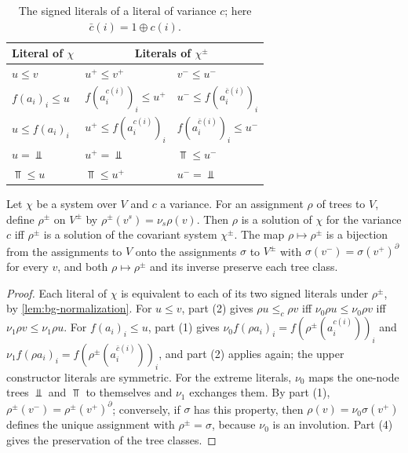 \begin{table}[t]
\caption{The signed literals of a literal of variance $c$; here
$\bar c(i)=1\oplus c(i)$.}
\label{tab:bg-signed}
\centering
\begin{tabular}{@{}lll@{}}
\toprule
Literal of $\chi$ & \multicolumn{2}{c}{Literals of $\chi^\pm$}\\
\midrule
$u\le v$ & $u^+\le v^+$ & $v^-\le u^-$\\
$f(a_i)_i\le u$ & $f(a_i^{c(i)})_i\le u^+$ & $u^-\le f(a_i^{\bar c(i)})_i$\\
$u\le f(a_i)_i$ & $u^+\le f(a_i^{c(i)})_i$ & $f(a_i^{\bar c(i)})_i\le u^-$\\
$u=\Bot$ & $u^+=\Bot$ & $\Top\le u^-$\\
$\Top\le u$ & $\Top\le u^+$ & $u^-=\Bot$\\
\bottomrule
\end{tabular}
\end{table}

\begin{lemma}\label{lem:bg-signed}
Let $\chi$ be a system over $V$ and $c$ a variance. For an assignment $\rho$ of
trees to $V$, define $\rho^\pm$ on $V^\pm$ by $\rho^\pm(v^s)=\nu_s\rho(v)$. Then
$\rho$ is a solution of $\chi$ for the variance $c$ iff $\rho^\pm$ is a solution
of the covariant system $\chi^\pm$. The map $\rho\mapsto\rho^\pm$ is a bijection
from the assignments to $V$ onto the assignments $\sigma$ to $V^\pm$ with
$\sigma(v^-)=\sigma(v^+)^{\partial}$ for every $v$, and both $\rho\mapsto\rho^\pm$
and its inverse preserve each tree class.
\end{lemma}
\begin{proof}
Each literal of $\chi$ is equivalent to each of its two signed literals under
$\rho^\pm$, by \cref{lem:bg-normalization}. For $u\le v$, part (2) gives
$\rho u\le_c\rho v$ iff $\nu_0\rho u\le\nu_0\rho v$ iff
$\nu_1\rho v\le\nu_1\rho u$. For $f(a_i)_i\le u$, part (1) gives
$\nu_0f(\rho a_i)_i=f(\rho^\pm(a_i^{c(i)}))_i$ and
$\nu_1f(\rho a_i)_i=f(\rho^\pm(a_i^{\bar c(i)}))_i$, and part (2) applies again;
the upper constructor literals are symmetric. For the extreme literals, $\nu_0$
maps the one-node trees $\Bot$ and $\Top$ to themselves and $\nu_1$ exchanges
them. By part (1), $\rho^\pm(v^-)=\rho^\pm(v^+)^{\partial}$; conversely, if
$\sigma$ has this property, then $\rho(v)=\nu_0\sigma(v^+)$ defines the unique
assignment with $\rho^\pm=\sigma$, because $\nu_0$ is an involution. Part (4)
gives the preservation of the tree classes.
\end{proof}

